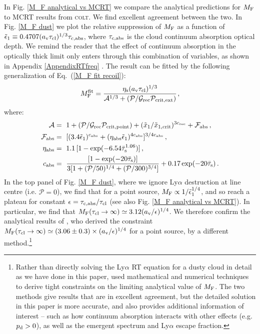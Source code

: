 \documentclass[fleqn,usenatbib]{mnras}
\newcommand{\taucl}{\tau_{\rm cl}}
\begin{document}
In Fig. \ref{M_F analytical vs MCRT} we compare the analytical predictions for $M_{\rm F}$ to MCRT results from \textsc{colt}. We find excellent agreement between the two. In Fig. \ref{M_F dust} we plot the relative suppression of $M_{\rm F}$ as a function of $\Tilde{\epsilon}_1 \equiv 0.4707(a_{\rm v} \taucl)^{1/3} \tau_{\rm c, abs}$, where $\tau_{\rm c,abs}$ is the cloud continuum absorption optical depth. We remind the reader that the effect of continuum absorption in the optically thick limit only enters through this combination of variables, as shown in Appendix \ref{AppendixRTfreq} \citep[see also][]{Neufeld1990}. The result can be fitted by the following generalization of Eq.~(\ref{M_F fit recoil}):
\begin{equation}
    M_{\rm F}^{\rm fit} =  \dfrac{\eta_{\rm s} (a_{\rm v}\taucl)^{1/3}}{\mathcal{A}^{1/3} + (\mathcal{P}/\mathcal{G}_{\rm rec}\mathcal{P}_{\rm crit,ext})} \hspace{1 pt} , \label{M_F fit continuum absorption}
\end{equation}
where:
\begin{align}
    \mathcal{A} &=~ 1 + ( \mathcal{P}/\mathcal{G}_{\rm rec}\mathcal{P}_{\rm crit,point}) + (\Tilde{x}_1/\Tilde{x}_{\rm 1,crit})^{3c_{\rm rec}} + \mathcal{F}_{\rm abs} \, , \\ \mathcal{F}_{\rm abs} &=~ [(3.4 \Tilde{\epsilon}_1)^{c_{\rm abs}} + (\eta_{\rm abs} \Tilde{\epsilon}_1)^{4c_{\rm abs}}]^{3/4c_{\rm abs}} \, , \\ \eta_{\rm abs} &=~ 1.1 \, [1 - \exp(-6.54 \Bar{\tau}_{\rm s}^{1.06})]\, , \\ c_{\rm abs} &=~ \dfrac{[1 - \exp(-20 \Bar{\tau}_{\rm s})]}{3[1 + (\mathcal{P}/50)^{1/4} + (\mathcal{P}/300)^{3/4}]} + 0.17 \exp(-20 \Bar{\tau}_{\rm s}) \, .
\end{align}
In the top panel of Fig. \ref{M_F dust}, where we ignore Ly$\alpha$ destruction at line centre (i.e. $\mathcal{P} = 0$), we find that for a point source, $M_{\rm F} \propto 1/\Tilde{\epsilon}_1^{1/4}$, and so reach a plateau for constant $\epsilon = \tau_{\rm c,abs}/\taucl$ (see also Fig. \ref{M_F analytical vs MCRT}). In particular, we find that $M_{\rm F}(\taucl \rightarrow \infty) \simeq 3.12 (a_{\rm v}/\epsilon)^{1/4}$. We therefore confirm the analytical results of \cite{Tomaselli2021}, who derived the constraint $M_{\rm F}(\taucl \rightarrow \infty) \simeq (3.06 \pm 0.3) \times (a_{\rm v}/\epsilon)^{1/4}$ for a point source, by a different method.\footnote{Rather than directly solving the Ly$\alpha$ RT equation for a dusty cloud in detail as we have done in this paper, \cite{Tomaselli2021} used mathematical and numerical techniques to derive tight constraints on the limiting analytical value of $M_{\rm F}$. The two methods give results that are in excellent agreement, but the detailed solution in this paper is more accurate, and also provides additional information of interest -- such as how continuum absorption interacts with other effects (e.g. $p_{\rm d} > 0$), as well as the emergent spectrum and Ly$\alpha$ escape fraction.}   
\end{document}
